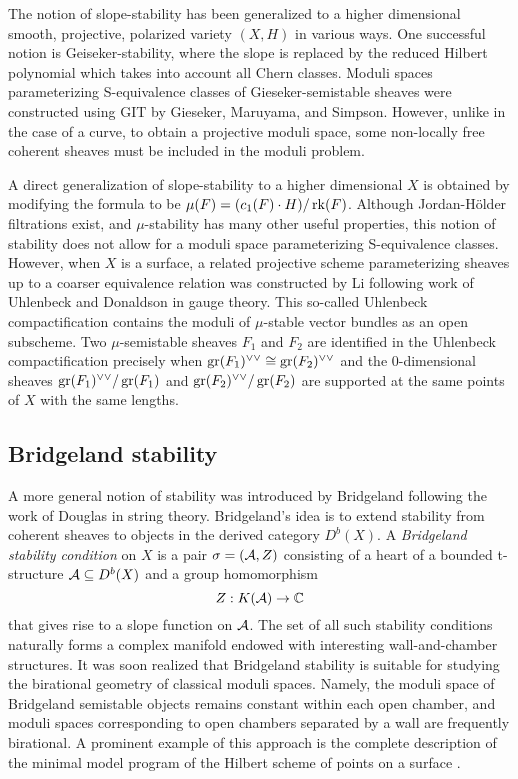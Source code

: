\documentclass[letterpaper,12pt]{amsart}
\theoremstyle{remark}
\begin{document}
The notion of slope-stability has been generalized to a higher dimensional smooth, projective, polarized variety $(X, H)$ in various ways. One successful notion is Geiseker-stability, where the slope is replaced by the reduced Hilbert polynomial which takes into account all Chern classes. Moduli spaces parameterizing S-equivalence classes of Gieseker-semistable sheaves were constructed using GIT by Gieseker, Maruyama, and Simpson. However, unlike in the case of a curve, to obtain a projective moduli space, some non-locally free coherent sheaves must be included in the moduli problem.

A direct generalization of slope-stability to a higher dimensional $X$ is obtained by modifying the formula to be $\mu(F) = (c_1(F) \cdot H)/\operatorname{\mathrm{rk}}(F)$. Although Jordan-H\"older filtrations exist, and $\mu$-stability has many other useful properties, this notion of stability does not allow for a moduli space parameterizing S-equivalence classes. However, when $X$ is a surface, a related projective scheme parameterizing sheaves up to a coarser equivalence relation was constructed by Li \cite{li} following work of Uhlenbeck and Donaldson in gauge theory. This so-called Uhlenbeck compactification contains the moduli of $\mu$-stable vector bundles as an open subscheme. Two $\mu$-semistable sheaves $F_1$ and $F_2$ are identified in the Uhlenbeck compactification precisely when $\operatorname{\mathrm{gr}}(F_1)^{\vee\vee} \cong \operatorname{\mathrm{gr}}(F_2)^{\vee\vee}$ and the 0-dimensional sheaves $\operatorname{\mathrm{gr}}(F_1)^{\vee\vee}/\operatorname{\mathrm{gr}}(F_1)$ and $\operatorname{\mathrm{gr}}(F_2)^{\vee\vee}/\operatorname{\mathrm{gr}}(F_2)$ are supported at the same points of $X$ with the same lengths. 

\subsection*{Bridgeland stability}

A more general notion of stability was introduced by Bridgeland \cite{bridgeland} following the work of Douglas in string theory. Bridgeland's idea is to extend stability from coherent sheaves to objects in the derived category $D^b(X)$. A \textit{Bridgeland stability condition} on $X$ is a pair $\sigma = (\mathcal{A}, Z)$ consisting of a heart of a bounded t-structure $\mathcal{A} \subseteq D^b(X)$ and a group homomorphism 
\[ Z: K(\mathcal{A}) \to \mathbb{C} \]
that gives rise to a slope function on $\mathcal{A}$. The set of all such stability conditions naturally forms a complex manifold endowed with interesting wall-and-chamber structures. It was soon realized that Bridgeland stability is suitable for studying the birational geometry of classical moduli spaces. Namely, the moduli space of Bridgeland semistable objects remains constant within each open chamber, and moduli spaces corresponding to open chambers separated by a wall are frequently birational. A prominent example of this approach is the complete description of the minimal model program of the Hilbert scheme of points on a surface \cite{ABCH}.
\end{document}
